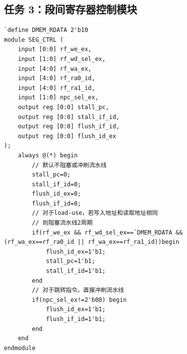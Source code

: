\documentclass[12pt,a4paper]{ctexart}
\begin{document}
\subsection{任务 3：段间寄存器控制模块}
\begin{lstlisting}[style=verilog]
`define DMEM_RDATA 2'b10
module SEG_CTRL (
    input [0:0] rf_we_ex,
    input [1:0] rf_wd_sel_ex,
    input [4:0] rf_wa_ex,
    input [4:0] rf_ra0_id,
    input [4:0] rf_ra1_id,
    input [1:0] npc_sel_ex,
    output reg [0:0] stall_pc,
    output reg [0:0] stall_if_id,
    output reg [0:0] flush_if_id,
    output reg [0:0] flush_id_ex
);
    always @(*) begin
        // 默认不阻塞或冲刷流水线
        stall_pc=0;
        stall_if_id=0;
        flush_id_ex=0;
        flush_if_id=0;
        // 对于load-use，若写入地址和读取地址相同
        // 则阻塞流水线2周期
        if(rf_we_ex && rf_wd_sel_ex==`DMEM_RDATA && (rf_wa_ex==rf_ra0_id || rf_wa_ex==rf_ra1_id))begin
            flush_id_ex=1'b1;
            stall_pc=1'b1;
            stall_if_id=1'b1;
        end
        // 对于跳转指令，直接冲刷流水线
        if(npc_sel_ex!=2'b00) begin
            flush_id_ex=1'b1;
            flush_if_id=1'b1;
        end
    end
endmodule
\end{lstlisting}
\end{document}
